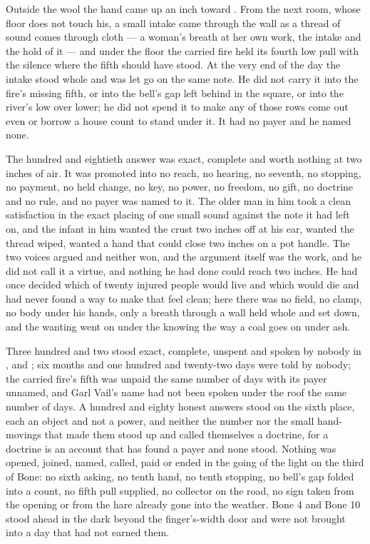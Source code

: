 Outside the wool the hand came up an inch toward . From the next room, whose floor does not touch his, a small intake came through the wall as a thread of sound comes through cloth --- a woman's breath at her own work, the intake and the hold of it --- and under the floor the carried fire held its fourth low pull with the silence where the fifth should have stood. At the very end of the day the intake stood whole and was let go on the same note. He did not carry it into the fire's missing fifth, or into the bell's gap left behind in the square, or into the river's low over lower; he did not spend it to make any of those rows come out even or borrow a house count to stand under it. It had no payer and he named none.

The hundred and eightieth answer was exact, complete and worth nothing at two inches of air. It was promoted into no reach, no hearing, no seventh, no stopping, no payment, no held change, no key, no power, no freedom, no gift, no doctrine and no rule, and no payer was named to it. The older man in him took a clean satisfaction in the exact placing of one small sound against the note it had left on, and the infant in him wanted the crust two inches off at his ear, wanted the thread wiped, wanted a hand that could close two inches on a pot handle. The two voices argued and neither won, and the argument itself was the work, and he did not call it a virtue, and nothing he had done could reach two inches. He had once decided which of twenty injured people would live and which would die and had never found a way to make that feel clean; here there was no field, no clamp, no body under his hands, only a breath through a wall held whole and set down, and the wanting went on under the knowing the way a coal goes on under ash.

Three hundred and two stood exact, complete, unspent and spoken by nobody in ,  and ; six months and one hundred and twenty-two days were told by nobody; the carried fire's fifth was unpaid the same number of days with its payer unnamed, and Garl Vail's name had not been spoken under the roof the same number of days. A hundred and eighty honest answers stood on the sixth place, each an object and not a power, and neither the number nor the small hand-movings that made them stood up and called themselves a doctrine, for a doctrine is an account that has found a payer and none stood. Nothing was opened, joined, named, called, paid or ended in the going of the light on the third of Bone: no sixth asking, no tenth hand, no tenth stopping, no bell's gap folded into a count, no fifth pull supplied, no collector on the road, no sign taken from the opening or from the hare already gone into the weather. Bone 4 and Bone 10 stood ahead in the dark beyond the finger's-width door and were not brought into a day that had not earned them.

